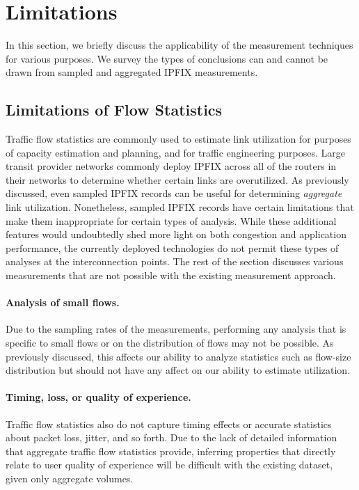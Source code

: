 \section{Limitations}\label{sec:applicability} 

In this section, we briefly discuss the applicability of the measurement
techniques for various purposes. We survey the types of conclusions
can and cannot be drawn from sampled and aggregated IPFIX measurements. 

\subsection{Limitations of Flow Statistics}

Traffic flow statistics are commonly used to estimate link utilization
for purposes of capacity estimation and planning, and for traffic
engineering purposes. Large transit provider networks commonly deploy
IPFIX across all of the routers in their networks to determine whether
certain links are overutilized.  As previously discussed, even sampled
IPFIX records can be useful for determining {\em aggregate} link
utilization.  Nonetheless, sampled IPFIX records have certain
limitations that make them inappropriate for certain types of
analysis. While these additional features would undoubtedly shed more
light on both congestion and application performance, the currently
deployed technologies do not permit these types of analyses at the
interconnection points.  The rest of the section discusses various
measurements that are not possible with the existing measurement
approach.

\paragraph{Analysis of small flows.} Due to the sampling rates of the
measurements, performing any analysis that is specific to small flows or
on the distribution of flows may not be possible. As previously
discussed, this affects our ability to analyze statistics such as
flow-size distribution but should not have any affect on our ability to
estimate utilization.

\paragraph{Timing, loss, or quality of experience.} Traffic flow
statistics also do not capture timing effects or accurate statistics
about packet loss, jitter, and so forth. Due to the lack of detailed
information that aggregate traffic flow statistics provide, inferring
properties that directly relate to user quality of experience will be
difficult with the existing dataset, given only aggregate volumes. 

